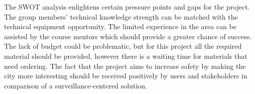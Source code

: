 \documentclass[twoside]{report}
\begin{document}
\begin{leftsiderules}
The SWOT analysis enlightens certain pressure points and gaps for the
project. The group members’ technical knowledge strength can be matched with
the technical equipment opportunity. The limited experience in the area can be
assisted by the course mentors which should provide a greater chance of success.
The lack of budget could be problematic, but for this project all the required
material should be provided, however there is a waiting time for materials that
need ordering. The fact that the project aims to increase safety by making the
city more interesting should be received positively by users and stakeholders in
comparison of a surveillance-centered solution.
\end{leftsiderules}
\end{document}
